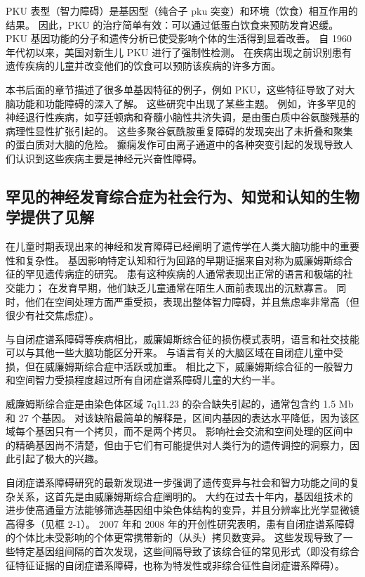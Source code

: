 PKU 表型（智力障碍）是基因型（纯合子 pku 突变）和环境（饮食）相互作用的结果。 因此，PKU 的治疗简单有效：可以通过低蛋白饮食来预防发育迟缓。 PKU 基因功能的分子和遗传分析已使受影响个体的生活得到显着改善。 自 1960 年代初以来，美国对新生儿 PKU 进行了强制性检测。 在疾病出现之前识别患有遗传疾病的儿童并改变他们的饮食可以预防该疾病的许多方面。

本书后面的章节描述了很多单基因特征的例子，例如 PKU，这些特征导致了对大脑功能和功能障碍的深入了解。 这些研究中出现了某些主题。 例如，许多罕见的神经退行性疾病，如亨廷顿病和脊髓小脑性共济失调，是由蛋白质中谷氨酸残基的病理性显性扩张引起的。 这些多聚谷氨酰胺重复障碍的发现突出了未折叠和聚集的蛋白质对大脑的危险。 癫痫发作可由离子通道中的各种突变引起的发现导致人们认识到这些疾病主要是神经元兴奋性障碍。


\subsection{罕见的神经发育综合症为社会行为、知觉和认知的生物学提供了见解}

在儿童时期表现出来的神经和发育障碍已经阐明了遗传学在人类大脑功能中的重要性和复杂性。 基因影响特定认知和行为回路的早期证据来自对称为威廉姆斯综合征的罕见遗传病症的研究。 患有这种疾病的人通常表现出正常的语言和极端的社交能力； 在发育早期，他们缺乏儿童通常在陌生人面前表现出的沉默寡言。 同时，他们在空间处理方面严重受损，表现出整体智力障碍，并且焦虑率非常高（但很少有社交焦虑症）。

与自闭症谱系障碍等疾病相比，威廉姆斯综合征的损伤模式表明，语言和社交技能可以与其他一些大脑功能区分开来。 与语言有关的大脑区域在自闭症儿童中受损，但在威廉姆斯综合症中活跃或加重。 相比之下，威廉姆斯综合征的一般智力和空间智力受损程度超过所有自闭症谱系障碍儿童的大约一半。

威廉姆斯综合症是由染色体区域 7q11.23 的杂合缺失引起的，通常包含约 1.5 Mb 和 27 个基因。 对该缺陷最简单的解释是，区间内基因的表达水平降低，因为该区域每个基因只有一个拷贝，而不是两个拷贝。 影响社会交流和空间处理的区间中的精确基因尚不清楚，但由于它们有可能提供对人类行为的遗传调控的洞察力，因此引起了极大的兴趣。

自闭症谱系障碍研究的最新发现进一步强调了遗传变异与社会和智力功能之间的复杂关系，这首先是由威廉姆斯综合症阐明的。 大约在过去十年内，基因组技术的进步使高通量方法能够筛选基因组中染色体结构的变异，并且分辨率比光学显微镜高得多（见框 2-1）。 2007 年和 2008 年的开创性研究表明，患有自闭症谱系障碍的个体比未受影响的个体更常携带新的（从头）拷贝数变异。 这些发现导致了一些特定基因组间隔的首次发现，这些间隔导致了该综合征的常见形式（即没有综合征特征证据的自闭症谱系障碍，也称为特发性或非综合征性自闭症谱系障碍）。

